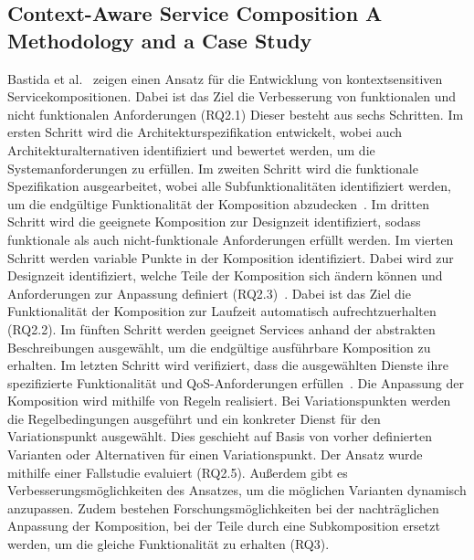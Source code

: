 \documentclass[conference,compsoc,ngerman]{IEEEtran}
\begin{document}
\subsection{Context-Aware Service Composition  A Methodology and a Case Study}
Bastida et al.~\cite{bastida2008context} zeigen einen Ansatz für die Entwicklung von  kontextsensitiven Servicekompositionen. Dabei ist das Ziel die Verbesserung von funktionalen und nicht funktionalen Anforderungen (RQ2.1) Dieser besteht aus sechs Schritten. Im ersten Schritt wird die Architekturspezifikation entwickelt, wobei auch Architekturalternativen identifiziert und bewertet werden, um die Systemanforderungen zu erfüllen. Im zweiten Schritt wird die funktionale Spezifikation ausgearbeitet, wobei alle Subfunktionalitäten identifiziert werden, um die endgültige Funktionalität der Komposition abzudecken~\cite{bastida2008context}. Im dritten Schritt wird die geeignete Komposition zur Designzeit identifiziert, sodass funktionale als auch nicht-funktionale Anforderungen erfüllt werden. Im vierten Schritt werden variable Punkte in der Komposition identifiziert. Dabei wird zur Designzeit identifiziert, welche Teile der Komposition sich ändern können und Anforderungen zur Anpassung definiert (RQ2.3)~\cite{bastida2008context}. Dabei ist das Ziel die Funktionalität der Komposition zur Laufzeit automatisch aufrechtzuerhalten (RQ2.2). Im fünften Schritt werden geeignet Services anhand der abstrakten Beschreibungen ausgewählt, um die endgültige ausführbare Komposition zu erhalten. Im letzten Schritt wird verifiziert, dass die ausgewählten Dienste ihre spezifizierte Funktionalität und QoS-Anforderungen erfüllen~\cite{bastida2008context}.
Die Anpassung der Komposition wird mithilfe von Regeln realisiert. Bei Variationspunkten werden die Regelbedingungen ausgeführt und ein konkreter Dienst für den Variationspunkt ausgewählt. Dies geschieht auf Basis von vorher definierten Varianten oder Alternativen für einen Variationspunkt.
Der Ansatz wurde mithilfe einer Fallstudie evaluiert (RQ2.5). Außerdem gibt es Verbesserungsmöglichkeiten des Ansatzes, um die möglichen Varianten dynamisch anzupassen. Zudem bestehen Forschungsmöglichkeiten bei der nachträglichen Anpassung der Komposition, bei der Teile durch eine Subkomposition ersetzt werden, um die gleiche Funktionalität zu erhalten (RQ3).
\end{document}
